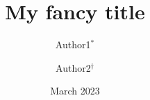 \documentclass[12pt]{article}
\title{My fancy title}
\author{Author1$^{\ast}$ \and Author2$^{\dag}$
}
\date{March 2023}
\begin{document}

\renewcommand*{\thepage}{title-\arabic{page}}
\maketitle
\renewcommand*{\thepage}{\arabic{page}}



% 






{\small

}
% 
\end{document}
